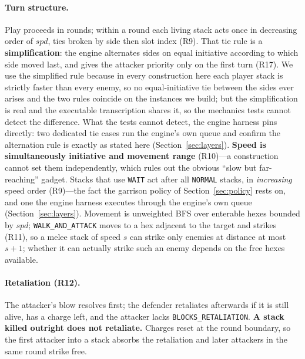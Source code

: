 \documentclass[11pt,a4paper]{article}
\theoremstyle{plain}
\theoremstyle{definition}
\theoremstyle{plain}
\theoremstyle{definition}
\theoremstyle{remark}
\begin{document}
\paragraph{Turn structure.} Play proceeds in rounds; within a round each living stack acts once in decreasing
order of $\mathit{spd}$, ties broken by side then slot index (R9). That tie rule is a
\textbf{simplification}: the engine alternates sides on equal initiative according to which side
moved last, and gives the attacker priority only on the first turn (R17). We use the simplified
rule because in every construction here each player stack is strictly faster than every enemy, so
no equal-initiative tie between the sides ever arises and the two rules coincide on the instances
we build; but the simplification is real and the executable transcription shares it, so the
mechanics tests cannot detect the difference. What the tests cannot detect, the engine harness
pins directly: two dedicated tie cases run the engine's own queue and confirm the alternation
rule is exactly as stated here (Section~\ref{sec:layers}). \textbf{Speed is simultaneously
initiative and movement range} (R10)---a construction cannot set them independently, which rules
out the obvious ``slow but far-reaching'' gadget. Stacks that use \texttt{WAIT} act after all
\texttt{NORMAL} stacks, in \emph{increasing} speed order (R9)---the fact the garrison policy of
Section~\ref{sec:policy} rests on, and one the engine harness executes through the engine's own
queue (Section~\ref{sec:layers}). Movement is unweighted BFS over enterable hexes bounded by
$\mathit{spd}$; \texttt{WALK\_AND\_ATTACK} moves to a hex adjacent to the target and strikes
(R11), so a melee stack of speed $s$ can strike only enemies at distance at most $s+1$;
whether it can actually strike such an enemy depends on the free hexes available.

\paragraph{Retaliation (R12).} The attacker's blow resolves first; the defender retaliates
afterwards if it is still alive, has a charge left, and the attacker lacks
\texttt{BLOCKS\_RETALIATION}. \textbf{A stack killed outright does not retaliate.} Charges
reset at the round boundary, so the first attacker into a stack absorbs the retaliation and
later attackers in the same round strike free.
\end{document}
